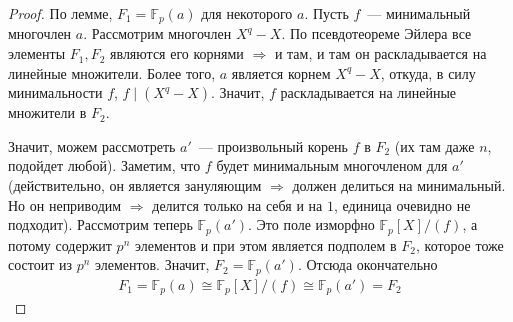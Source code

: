 \begin{proof}
    По лемме, $F_1=\mathbb{F}_p(a)$ для некоторого $a$.
    Пусть $f$~--- минимальный многочлен $a$.
    Рассмотрим многочлен $X^q-X$.
    По псевдотеореме Эйлера все элементы $F_1, F_2$ являются его корнями $\Rightarrow$ и там, и там он раскладывается на линейные множители.
    Более того, $a$ является корнем $X^q-X$, откуда, в силу минимальности $f$, $f \mid (X^q-X)$.
    Значит, $f$ раскладывается на линейные множители в $F_2$.

    Значит, можем рассмотреть $a'$~--- произвольный корень $f$ в $F_2$ (их там даже $n$, подойдет любой).
    Заметим, что $f$ будет минимальным многочленом для $a'$ (действительно, он является зануляющим $\Rightarrow$ должен делиться на минимальный. Но он неприводим $\Rightarrow$ делится только на себя и на $1$, единица очевидно не подходит).
    Рассмотрим теперь $\mathbb{F}_p(a')$.
    Это поле изморфно $\mathbb{F}_p[X] / (f)$, а потому содержит $p^n$ элементов и при этом является подполем в $F_2$, которое тоже состоит из $p^n$ элементов.
    Значит, $F_2 = \mathbb{F}_p(a')$.
    Отсюда окончательно
    \begin{gather*}
        F_1 = \mathbb{F}_p(a) \cong \mathbb{F}_p[X] / (f) \cong \mathbb{F}_p(a') = F_2
    \end{gather*}
\end{proof}